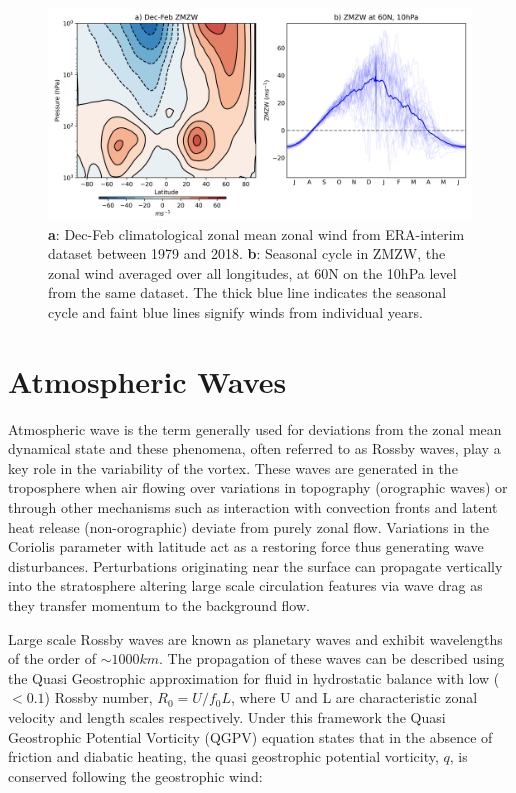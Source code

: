 \begin{figure}[h!]
\centering
    \includegraphics[width= \linewidth]{Figures/Figures-background/ZMZW_clim_cycle_ERA.png}
    \caption{\textbf{a}: Dec-Feb climatological zonal mean zonal wind from ERA-interim dataset between 1979 and 2018. \textbf{b}: Seasonal cycle in ZMZW, the zonal wind averaged over all longitudes, at 60N on the 10hPa level from the same dataset. The thick blue line indicates the seasonal cycle and faint blue lines signify winds from individual years.}
    \label{fig:ERAclimDJF}
\centering
\end{figure}

\section{Atmospheric Waves}
\label{sec:atmos_waves}
Atmospheric wave is the term generally used for deviations from the zonal mean dynamical state and these phenomena, often referred to as Rossby waves, play a key role in the variability of the vortex. These waves are generated in the troposphere when air flowing over variations in topography (orographic waves) or through other mechanisms such as interaction with convection fronts and latent heat release (non-orographic) deviate from purely zonal flow. Variations in the Coriolis parameter with latitude act as a restoring force thus generating wave disturbances. Perturbations originating near the surface can propagate vertically into the stratosphere altering large scale circulation features via wave drag as they transfer momentum to the background flow. 

Large scale Rossby waves are known as planetary waves and exhibit wavelengths of the order of $\sim 1000km$. The propagation of these waves can be described using the Quasi Geostrophic approximation for fluid in hydrostatic balance with low ($<0.1$) Rossby number, $R_0 = U/f_0 L$, where U and L are characteristic zonal velocity and length scales respectively. Under this framework the Quasi Geostrophic Potential Vorticity (QGPV) equation states that in the absence of friction and diabatic heating, the quasi geostrophic potential vorticity, $q$, is conserved following the geostrophic wind:

